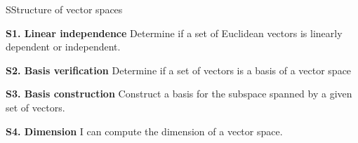 
\begin{module}{S}{Structure of vector spaces}

\begin{moduleStandards}
  \item \textbf{S1. Linear independence}
         Determine if a set of Euclidean vectors is linearly dependent or
        independent.
  \item \textbf{S2. Basis verification}
        Determine if a set of vectors is a basis of a vector space
  \item \textbf{S3. Basis construction}
        Construct a basis for the subspace spanned by a given set of vectors.
  \item \textbf{S4. Dimension}
        I can compute the dimension of a vector space.
\end{moduleStandards}






\end{module}
